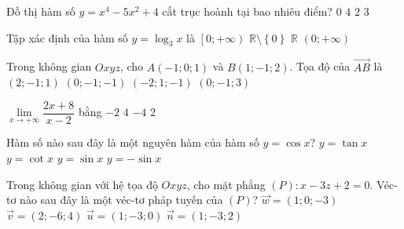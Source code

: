 \begin{ex}%
	Đồ thị hàm số $y=x^4-5x^2+4$ cắt trục hoành tại bao nhiêu điểm?
	\choice
	{$0$}
	{\True $4$}
	{$2$}
	{$3$}
\end{ex}
\begin{ex}%
	Tập xác định của hàm số $y=\log_3{x}$ là
	\choice
	{$\left[0;+\infty \right)$}
	{$\mathbb{R}\setminus {\left\lbrace 0\right\rbrace}$}
	{$\mathbb{R}$}
	{\True $\left(0;+\infty \right)$}
\end{ex}
\begin{ex}%
	Trong không gian $Oxyz$, cho $A(-1;0;1)$ và $B(1;-1;2)$. Tọa độ của $\overrightarrow{AB}$ là	\choice
	{\True $(2;-1;1)$}
	{$(0;-1;-1)$}
	{$(-2;1;-1)$}
	{$(0;-1;3)$}
\end{ex}
\begin{ex}%
	$\lim\limits_{x \rightarrow +\infty}{\dfrac{2x+8}{x-2}}$ bằng
	\choice
	{$-2$}
	{$4$}
	{$-4$}
	{\True $2$}
\end{ex}
\begin{ex}%
	Hàm số nào sau đây là một nguyên hàm của hàm số $y=\cos{x}$?
	\choice
	{$y=\tan{x}$}
	{$y=\cot{x}$}
	{\True $y=\sin{x}$}
	{$y=-\sin{x}$}
\end{ex}
\begin{ex}%
	Trong không gian với hệ tọa độ $Oxyz$, cho mặt phẳng $(P)\colon x-3z+2=0$. Véc-tơ nào sau đây là một véc-tơ pháp tuyến của $(P)$?
	\choice
	{\True $\overrightarrow{w}=(1;0;-3)$}
	{$\overrightarrow{v}=(2;-6;4)$}
	{$\overrightarrow{u}=(1;-3;0)$}
	{$\overrightarrow{n}=(1;-3;2)$}
\end{ex}
